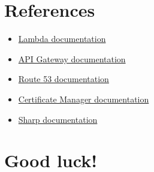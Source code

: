 \documentclass{article}
\begin{document}
\section{References}\label{references}
\begin{itemize}
\item \href{https://docs.aws.amazon.com/lambda/latest/dg/welcome.html}{Lambda documentation}
\item \href{https://docs.aws.amazon.com/apigateway/latest/developerguide/welcome.html}{API Gateway documentation}
\item \href{https://docs.aws.amazon.com/Route53/latest/DeveloperGuide/Welcome.html}{Route 53 documentation}
\item \href{https://docs.aws.amazon.com/acm/latest/userguide/acm-overview.html}{Certificate Manager documentation}
\item \href{https://sharp.pixelplumbing.com/}{Sharp documentation}
\end{itemize}

\section*{Good luck!}
\end{document}
